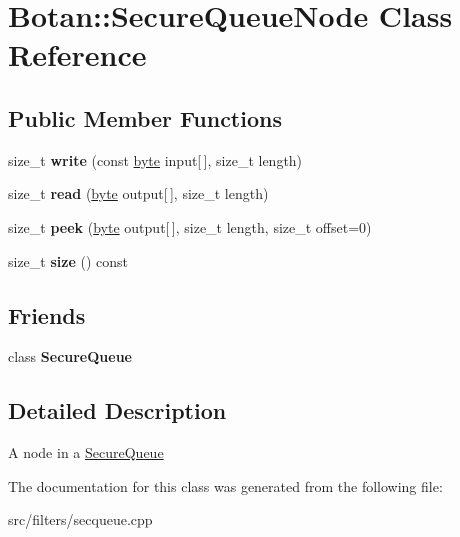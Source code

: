 \hypertarget{classBotan_1_1SecureQueueNode}{\section{Botan\-:\-:Secure\-Queue\-Node Class Reference}
\label{classBotan_1_1SecureQueueNode}
}
\subsection*{Public Member Functions}
\begin{DoxyCompactItemize}
\item 
\hypertarget{classBotan_1_1SecureQueueNode_a080f4f2b270fbea89a863ed8108770d0}{size\-\_\-t {\bfseries write} (const \hyperlink{namespaceBotan_a7d793989d801281df48c6b19616b8b84}{byte} input\mbox{[}$\,$\mbox{]}, size\-\_\-t length)}\label{classBotan_1_1SecureQueueNode_a080f4f2b270fbea89a863ed8108770d0}

\item 
\hypertarget{classBotan_1_1SecureQueueNode_abf000c29e2744563308f06c28f2ea0a9}{size\-\_\-t {\bfseries read} (\hyperlink{namespaceBotan_a7d793989d801281df48c6b19616b8b84}{byte} output\mbox{[}$\,$\mbox{]}, size\-\_\-t length)}\label{classBotan_1_1SecureQueueNode_abf000c29e2744563308f06c28f2ea0a9}

\item 
\hypertarget{classBotan_1_1SecureQueueNode_a977040c5077a97ac0e13eb4c26aad27d}{size\-\_\-t {\bfseries peek} (\hyperlink{namespaceBotan_a7d793989d801281df48c6b19616b8b84}{byte} output\mbox{[}$\,$\mbox{]}, size\-\_\-t length, size\-\_\-t offset=0)}\label{classBotan_1_1SecureQueueNode_a977040c5077a97ac0e13eb4c26aad27d}

\item 
\hypertarget{classBotan_1_1SecureQueueNode_a7f5890e4f39af1aae4f37a025e44bb11}{size\-\_\-t {\bfseries size} () const }\label{classBotan_1_1SecureQueueNode_a7f5890e4f39af1aae4f37a025e44bb11}

\end{DoxyCompactItemize}
\subsection*{Friends}
\begin{DoxyCompactItemize}
\item 
\hypertarget{classBotan_1_1SecureQueueNode_a8b4ec14d48384543a43b875cba10512e}{class {\bfseries Secure\-Queue}}\label{classBotan_1_1SecureQueueNode_a8b4ec14d48384543a43b875cba10512e}

\end{DoxyCompactItemize}


\subsection{Detailed Description}
A node in a \hyperlink{classBotan_1_1SecureQueue}{Secure\-Queue} 

The documentation for this class was generated from the following file\-:\begin{DoxyCompactItemize}
\item 
src/filters/secqueue.\-cpp\end{DoxyCompactItemize}
